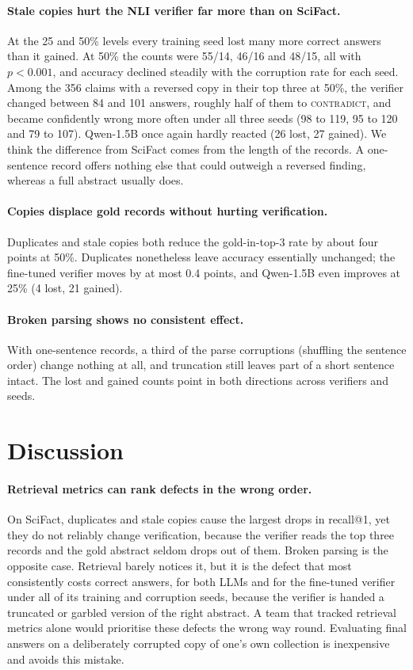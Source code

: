 \documentclass[11pt]{article}
\newcommand{\Con}{\textsc{contradict}}
\begin{document}
\paragraph{Stale copies hurt the NLI verifier far more than on SciFact.} At the 25 and 50\% levels every
training seed lost many more correct answers than it gained. At 50\% the counts were 55/14, 46/16 and 48/15,
all with $p<0.001$, and accuracy declined steadily with the corruption rate for each seed. Among the 356
claims with a reversed copy in their top three at 50\%, the verifier changed between 84 and 101 answers,
roughly half of them to \Con, and became confidently wrong more often under all three seeds (98 to 119, 95
to 120 and 79 to 107). Qwen-1.5B once again hardly reacted (26 lost, 27 gained). We think the difference from
SciFact comes from the length of the records. A one-sentence record offers nothing else that could outweigh a
reversed finding, whereas a full abstract usually does.

\paragraph{Copies displace gold records without hurting verification.} Duplicates and stale copies both
reduce the gold-in-top-3 rate by about four points at 50\%. Duplicates nonetheless leave accuracy
essentially unchanged; the fine-tuned verifier moves by at most 0.4 points, and Qwen-1.5B even improves at
25\% (4 lost, 21 gained).

\paragraph{Broken parsing shows no consistent effect.} With one-sentence records, a third of the parse
corruptions (shuffling the sentence order) change nothing at all, and truncation still leaves part of a short
sentence intact. The lost and gained counts point in both directions across verifiers and seeds.

\section{Discussion}

\paragraph{Retrieval metrics can rank defects in the wrong order.} On SciFact, duplicates and stale copies
cause the largest drops in recall@1, yet they do not reliably change verification, because the verifier reads
the top three records and the gold abstract seldom drops out of them. Broken parsing is the opposite case.
Retrieval barely notices it, but it is the defect that most consistently costs correct answers, for both LLMs
and for the fine-tuned verifier under all of its training and corruption seeds, because the verifier is handed
a truncated or garbled version of the right abstract. A team that tracked retrieval metrics alone would
prioritise these defects the wrong way round. Evaluating final answers on a deliberately corrupted copy of
one's own collection is inexpensive and avoids this mistake.
\end{document}
